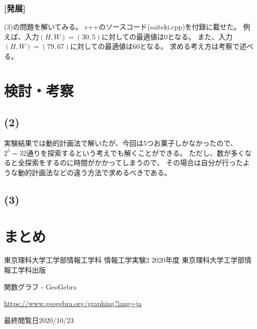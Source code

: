 \documentclass[12pt]{jarticle}
\begin{document}
\subsubsection*{[発展]}
(3)の問題を解いてみる。
c++のソースコード(saiteki.cpp)を付録に載せた。
例えば、入力$(H,W)=(30,5)$に対しての最適値は0となる。
また、入力$(H,W)=(79,67)$に対しての最適値は60となる。
求める考え方は考察で述べる。

\clearpage
\section{検討・考察}
\subsection*{(2)}


実験結果では動的計画法で解いたが、今回は5つお菓子しかなかったので、$2^5=32$通りを探索するという考えでも解くことができる。
ただし、数が多くなると全探索をするのに時間がかかってしまうので、
その場合は自分が行ったような動的計画法などの違う方法で求めるべきである。




\subsection*{(3)}

\section{まとめ}


\clearpage

\begin{thebibliography}{99}
    \label{sannkoubunnkenn_chapter}
    東京理科大学工学部情報工学科 情報工学実験2 2020年度
    東京理科大学工学部情報工学科出版

    関数グラフ - GeoGebra

    \url{https://www.geogebra.org/graphing?lang=ja}

    最終閲覧日2020/10/23

\end{thebibliography}


\clearpage

\appendix
\end{document}
